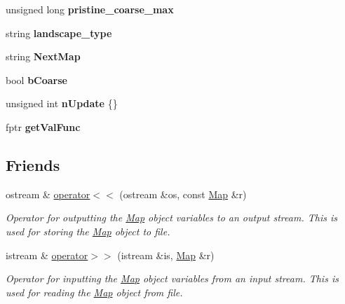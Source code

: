 \begin{DoxyCompactItemize}
\item 
unsigned long {\bfseries pristine\+\_\+coarse\+\_\+max}\hypertarget{class_map_af92e8eded3e1d8113ea733d4ef24b5c0}{}\label{class_map_af92e8eded3e1d8113ea733d4ef24b5c0}

\item 
string {\bfseries landscape\+\_\+type}\hypertarget{class_map_a81e886ea2c2168c3d8b33a3e9502901a}{}\label{class_map_a81e886ea2c2168c3d8b33a3e9502901a}

\item 
string {\bfseries Next\+Map}\hypertarget{class_map_a8346e76eb734528fc6cffc2170517c3d}{}\label{class_map_a8346e76eb734528fc6cffc2170517c3d}

\item 
bool {\bfseries b\+Coarse}\hypertarget{class_map_aa2478803a3e80e91042d054de88e9ee1}{}\label{class_map_aa2478803a3e80e91042d054de88e9ee1}

\item 
unsigned int {\bfseries n\+Update} \{\}\hypertarget{class_map_ae91de9d71b1aa841d73adcacaf1777d8}{}\label{class_map_ae91de9d71b1aa841d73adcacaf1777d8}

\item 
fptr {\bfseries get\+Val\+Func}\hypertarget{class_map_af2ed0369327fb4dbe0e7f7fc5088920d}{}\label{class_map_af2ed0369327fb4dbe0e7f7fc5088920d}

\end{DoxyCompactItemize}
\subsection*{Friends}
\begin{DoxyCompactItemize}
\item 
ostream \& \hyperlink{class_map_a0da37af2cd547fa045e06a2da3c1039f}{operator$<$$<$} (ostream \&os, const \hyperlink{class_map}{Map} \&r)
\begin{DoxyCompactList}\small\item\em Operator for outputting the \hyperlink{class_map}{Map} object variables to an output stream. This is used for storing the \hyperlink{class_map}{Map} object to file. \end{DoxyCompactList}\item 
istream \& \hyperlink{class_map_a480da4c3f474c0af7eacdde650546dc1}{operator$>$$>$} (istream \&is, \hyperlink{class_map}{Map} \&r)
\begin{DoxyCompactList}\small\item\em Operator for inputting the \hyperlink{class_map}{Map} object variables from an input stream. This is used for reading the \hyperlink{class_map}{Map} object from file. \end{DoxyCompactList}\end{DoxyCompactItemize}


